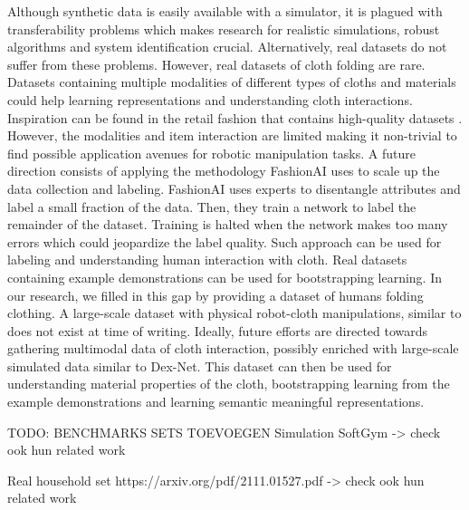 \documentclass[\home/main.tex]{subfiles}
\begin{document}
Although synthetic data is easily available with a simulator, it is plagued with transferability problems which makes research for realistic simulations, robust algorithms and system identification crucial. Alternatively, real datasets do not suffer from these problems. However, real datasets of cloth folding are rare. Datasets containing multiple modalities of different types of cloths and materials could help learning representations and understanding cloth interactions. Inspiration can be found in the retail fashion that contains high-quality datasets \autocite{DeepFashion, DeepFashion2, FashionAI}. However, the modalities and item interaction are limited making it non-trivial to find possible application avenues for robotic manipulation tasks. A future direction consists of applying the methodology FashionAI \autocite{FashionAI} uses to scale up the data collection and labeling. FashionAI uses experts to disentangle attributes and label a small fraction of the data. Then, they train a network to label the remainder of the dataset. Training is halted when the network makes too many errors which could jeopardize the label quality. Such approach can be used for labeling and understanding human interaction with cloth. 
Real datasets containing example demonstrations can be used for bootstrapping learning. In our research, we filled in this gap by providing a dataset of humans folding clothing. A large-scale dataset with physical robot-cloth manipulations, similar to \autocite{Levine2016} does not exist at time of writing. Ideally, future efforts are directed towards gathering multimodal data of cloth interaction, possibly enriched with large-scale simulated data similar to Dex-Net. This dataset can then be used for understanding material properties of the cloth, bootstrapping learning from the example demonstrations and learning semantic meaningful representations.


TODO: BENCHMARKS SETS TOEVOEGEN
    Simulation
        SoftGym
        -> check ook hun related work 

    Real 
        household set https://arxiv.org/pdf/2111.01527.pdf 
            -> check ook hun related work 
\end{document}
